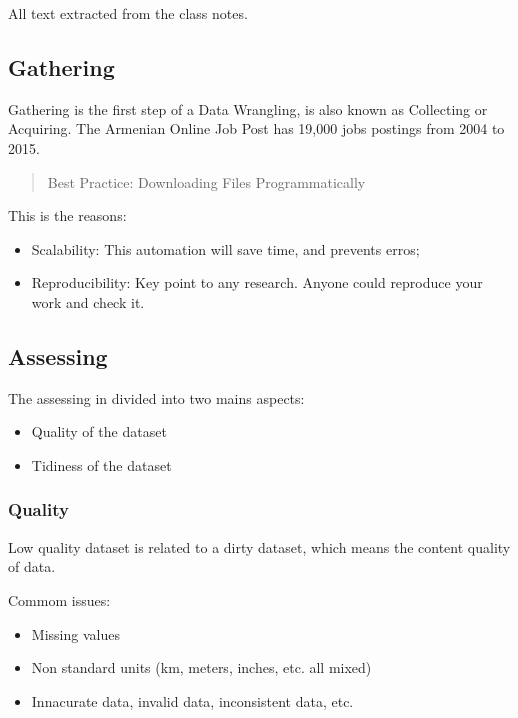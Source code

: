 \documentclass[]{book}
\providecommand{\tightlist}{%
  \setlength{\itemsep}{0pt}\setlength{\parskip}{0pt}}
\begin{document}
All text extracted from the class notes.

\subsection{Gathering}\label{gathering}

Gathering is the first step of a Data Wrangling, is also known as
Collecting or Acquiring. The Armenian Online Job Post has 19,000 jobs
postings from 2004 to 2015.

\begin{quote}
Best Practice: Downloading Files Programmatically
\end{quote}

This is the reasons:

\begin{itemize}
\tightlist
\item
  Scalability: This automation will save time, and prevents erros;
\item
  Reproducibility: Key point to any research. Anyone could reproduce
  your work and check it.
\end{itemize}

\subsection{Assessing}\label{assessing}

The assessing in divided into two mains aspects:

\begin{itemize}
\tightlist
\item
  Quality of the dataset
\item
  Tidiness of the dataset
\end{itemize}

\subsubsection{Quality}\label{quality}

Low quality dataset is related to a dirty dataset, which means the
content quality of data.

Commom issues:

\begin{itemize}
\tightlist
\item
  Missing values
\item
  Non standard units (km, meters, inches, etc. all mixed)
\item
  Innacurate data, invalid data, inconsistent data, etc.
\end{itemize}
\end{document}
